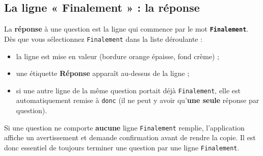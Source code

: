 \documentclass[11pt,a4paper]{article}
\begin{document}
\begin{center}
\end{center}

\subsection{La ligne « Finalement » : la réponse}

\begin{retenir}
La \textbf{réponse} à une question est la ligne qui commence par le mot
\textbf{\texttt{Finalement}}. Dès que vous sélectionnez \texttt{Finalement} dans la
liste déroulante :
\begin{itemize}
  \item la ligne est mise en valeur (bordure orange épaisse, fond crème) ;
  \item une étiquette \textbf{Réponse} apparaît au-dessus de la ligne ;
  \item si une autre ligne de la même question portait déjà \texttt{Finalement},
        elle est automatiquement remise à \texttt{donc} (il ne peut y avoir
        qu'\textbf{une seule} réponse par question).
\end{itemize}
\end{retenir}

\begin{attention}
Si une question ne comporte \textbf{aucune} ligne \texttt{Finalement} remplie,
l'application affiche un avertissement et demande confirmation avant de rendre la copie.
Il est donc essentiel de toujours terminer une question par une ligne
\texttt{Finalement}.
\end{attention}
\end{document}
